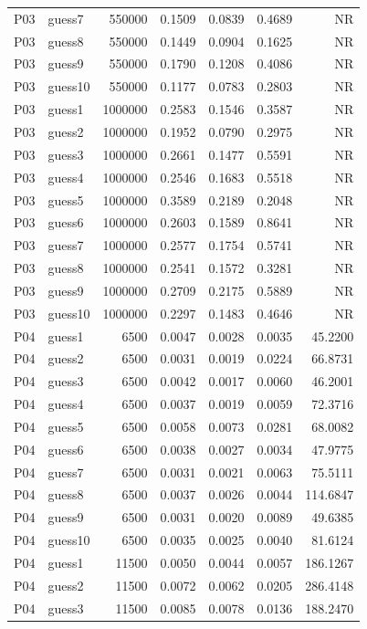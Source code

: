 {\begin{longtable}{llrrrrr}
P03 & guess7 & 550000 & 0.1509 & 0.0839 & 0.4689 & NR \\
P03 & guess8 & 550000 & 0.1449 & 0.0904 & 0.1625 & NR \\
P03 & guess9 & 550000 & 0.1790 & 0.1208 & 0.4086 & NR \\
P03 & guess10 & 550000 & 0.1177 & 0.0783 & 0.2803 & NR \\
P03 & guess1 & 1000000 & 0.2583 & 0.1546 & 0.3587 & NR \\
P03 & guess2 & 1000000 & 0.1952 & 0.0790 & 0.2975 & NR \\
P03 & guess3 & 1000000 & 0.2661 & 0.1477 & 0.5591 & NR \\
P03 & guess4 & 1000000 & 0.2546 & 0.1683 & 0.5518 & NR \\
P03 & guess5 & 1000000 & 0.3589 & 0.2189 & 0.2048 & NR \\
P03 & guess6 & 1000000 & 0.2603 & 0.1589 & 0.8641 & NR \\
P03 & guess7 & 1000000 & 0.2577 & 0.1754 & 0.5741 & NR \\
P03 & guess8 & 1000000 & 0.2541 & 0.1572 & 0.3281 & NR \\
P03 & guess9 & 1000000 & 0.2709 & 0.2175 & 0.5889 & NR \\
P03 & guess10 & 1000000 & 0.2297 & 0.1483 & 0.4646 & NR \\
P04 & guess1 & 6500 & 0.0047 & 0.0028 & 0.0035 & 45.2200 \\
P04 & guess2 & 6500 & 0.0031 & 0.0019 & 0.0224 & 66.8731 \\
P04 & guess3 & 6500 & 0.0042 & 0.0017 & 0.0060 & 46.2001 \\
P04 & guess4 & 6500 & 0.0037 & 0.0019 & 0.0059 & 72.3716 \\
P04 & guess5 & 6500 & 0.0058 & 0.0073 & 0.0281 & 68.0082 \\
P04 & guess6 & 6500 & 0.0038 & 0.0027 & 0.0034 & 47.9775 \\
P04 & guess7 & 6500 & 0.0031 & 0.0021 & 0.0063 & 75.5111 \\
P04 & guess8 & 6500 & 0.0037 & 0.0026 & 0.0044 & 114.6847 \\
P04 & guess9 & 6500 & 0.0031 & 0.0020 & 0.0089 & 49.6385 \\
P04 & guess10 & 6500 & 0.0035 & 0.0025 & 0.0040 & 81.6124 \\
P04 & guess1 & 11500 & 0.0050 & 0.0044 & 0.0057 & 186.1267 \\
P04 & guess2 & 11500 & 0.0072 & 0.0062 & 0.0205 & 286.4148 \\
P04 & guess3 & 11500 & 0.0085 & 0.0078 & 0.0136 & 188.2470 \\

\end{longtable}}
